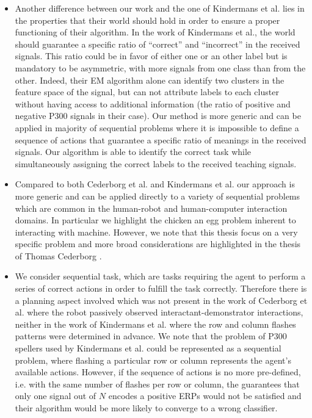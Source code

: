 \begin{itemize}
\item Another difference between our work and the one of Kindermans et al. lies in the properties that their world should hold in order to ensure a proper functioning of their algorithm. In the work of Kindermans et al., the world should guarantee a specific ratio of ``correct'' and ``incorrect'' in the received signals. This ratio could be in favor of either one or an other label but is mandatory to be asymmetric, with more signals from one class than from the other. Indeed, their EM algorithm alone can identify two clusters in the feature space of the signal, but can not attribute labels to each cluster without having access to additional information (the ratio of positive and negative P300 signals in their case). Our method is more generic and can be applied in majority of sequential problems where it is impossible to define a sequence of actions that guarantee a specific ratio of meanings in the received signals. Our algorithm is able to identify the correct task while simultaneously assigning the correct labels to the received teaching signals.

\item Compared to both Cederborg et al. and Kindermans et al. our approach is more generic and can be applied directly to a variety of sequential problems which are common in the human-robot and human-computer interaction domains. In particular we highlight the chicken an egg problem inherent to interacting with machine. However, we note that this thesis focus on a very specific problem and more broad considerations are highlighted in the thesis of Thomas Cederborg \cite{cederborg2014thesis}.

\item We consider sequential task, which are tasks requiring the agent to perform a series of correct actions in order to fulfill the task correctly. Therefore there is a planning aspect involved which was not present in the work of Cederborg et al. where the robot passively observed interactant-demonstrator interactions, neither in the work of Kindermans et al. where the row and column flashes patterns were determined in advance. We note that the problem of P300 spellers used by Kindermans et al. could be represented as a sequential problem, where flashing a particular row or column represents the agent's available actions. However, if the sequence of actions is no more pre-defined, i.e. with the same number of flashes per row or column, the guarantees that only one signal out of $N$ encodes a positive ERPs would not be satisfied and their algorithm would be more likely to converge to a wrong classifier.


\end{itemize}
